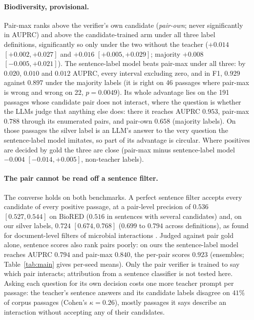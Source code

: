 \documentclass[11pt]{article}
\begin{document}
\paragraph{Biodiversity, provisional.}
Pair-max ranks above the verifier's own candidate (\emph{pair-own}; never significantly in AUPRC)
and above the candidate-trained arm under all three label definitions, significantly so only under
the two without the teacher ($+0.014$ $[+0.002, +0.027]$ and $+0.016$ $[+0.005, +0.029]$; majority
$+0.008$ $[-0.005, +0.021]$). The sentence-label model beats pair-max under all three: by $0.020$,
$0.010$ and $0.012$ AUPRC, every interval excluding zero, and in F1, $0.929$ against $0.897$ under
the majority labels (it is right on 46 passages where pair-max is wrong and wrong on 22,
$p = 0.0049$). Its whole advantage lies on the 191 passages whose candidate pair does not interact,
where the question is whether the LLMs judge that anything else does: there it reaches AUPRC
$0.953$, pair-max $0.788$ through its enumerated pairs, and pair-own $0.658$ (majority labels). On
those passages the silver label is an LLM's answer to the very question the sentence-label model
imitates, so part of its advantage is circular. Where positives are decided by gold the three are
close (pair-max minus sentence-label model $-0.004$ $[-0.014, +0.005]$, non-teacher
labels).

\paragraph{The pair cannot be read off a sentence filter.}
The converse holds on both benchmarks. A perfect sentence filter accepts every candidate of every
positive passage, at a pair-level precision of $0.536$ $[0.527, 0.544]$ on BioRED ($0.516$ in
sentences with several candidates) and, on our silver labels, $0.724$ $[0.674, 0.768]$ ($0.699$ to
$0.794$ across definitions), as found for document-level filters of microbial interactions
\citep{lim2016minter}.
Judged against pair gold alone, sentence scores also rank pairs poorly: on ours the sentence-label
model reaches AUPRC $0.794$ and pair-max $0.840$, the per-pair scores $0.923$ (ensembles;
Table~\ref{tab:main} gives per-seed means). Only the pair verifier is trained to say which pair
interacts; attribution from a sentence classifier \citep{pavlopoulos2022from} is not tested here.
Asking each question for its own decision costs one more teacher prompt per passage: the teacher's
sentence answers and its candidate labels disagree on $41\%$ of corpus passages (Cohen's
$\kappa = 0.26$), mostly passages it says describe an interaction without accepting any of their
candidates.
\end{document}
